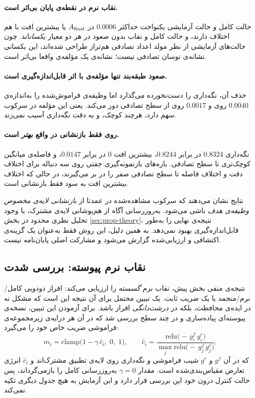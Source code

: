 

\paragraph{نقاب نرم در نقطه‌ی پایان بی‌اثر است.} حالت کامل و حالت آزمایشی یکنواخت حداکثر $0.0006$ در $A_{\mathrm{final}}$ یا بیشترین افت با هم اختلاف دارند، و حالت کامل و نقاب بدون صعود در هر دو معیار \emph{یکسان}اند. چون حالت‌های آزمایشی از نظر مولد اعداد تصادفی هم‌تراز طراحی شده‌اند، این یکسانی نشانه‌ی نوسان تصادفی نیست؛ نشانه‌ی یک مؤلفه‌ی واقعا بی‌اثر است.

\paragraph{صعود طبقه‌بند تنها مؤلفه‌ی با اثر قابل‌اندازه‌گیری است.} حذف آن، نگه‌داری را دست‌نخورده می‌گذارد اما وظیفه‌ی فراموش‌شده را به‌اندازه‌ی $0.0040$ روی  و $0.0017$ روی  از سطح تصادفی دور می‌کند. یعنی این مؤلفه در سرکوب سهم دارد، هرچند کوچک، و به دقت نگه‌داری آسیب نمی‌زند.

\paragraph{روی  فقط بازنشانی در واقع \emph{بهتر} است.} نگه‌داری $0.8324$ در برابر $0.8244$، بیشترین افت $0$ در برابر $0.0147$، و فاصله‌ی میانگین کوچک‌تری تا سطح تصادفی. بازه‌های بازنمونه‌گیری جفتی روی سه دنباله برای اختلاف دقت و اختلاف فاصله تا سطح تصادفی صفر را در بر می‌گیرند، در حالی که اختلاف بیشترین افت به سود فقط بازنشانی است.

نتایج نشان می‌دهند که سرکوب مشاهده‌شده در  عمدتا از \emph{بازنشانی لایه‌ی مخصوص وظیفه‌ی هدف} ناشی می‌شود. به‌روزرسانی آگاه از هم‌پوشانی لایه‌ی مشترک، با وجود تحلیل نظری محدود در بخش \ref{sec:prop-theory}، نتیجه‌ی نهایی را به‌طور قابل‌اندازه‌گیری بهبود نمی‌دهد. به همین دلیل، این روش فقط به‌عنوان یک گزینه‌ی اکتشافی و ارزیابی‌شده گزارش می‌شود و مشارکت اصلی پایان‌نامه نیست.

\subsection{نقاب نرم پیوسته: بررسی شدت}
\label{subsec:res-conflict-gamma}

نتیجه‌ی منفی بخش پیش، نقاب نرم \emph{گسسته} را ارزیابی می‌کند: افراز دودویی کامل/نرم/منجمد با یک ضریب ثابت. یک تبیین محتمل برای آن نتیجه این است که مشکل نه در ایده‌ی محافظت، بلکه در \emph{درشت‌دانگی} افراز باشد. برای آزمودن این تبیین، نسخه‌ی پیوسته‌ای پیاده‌سازی و در چند سطح بررسی شد که در آن هر درایه‌ی زیرمجموعه‌ی فراموشی ضریب خاص خود را می‌گیرد:
\begin{equation}
\label{eq:continuous-mask}
	m_i=\mathrm{clamp}\big(1-\gamma\,\hat c_i,\;0,\;1\big),
	\qquad
	\hat c_i=\frac{\mathrm{relu}\big(-\,g^{f}_i\,g^{r}_i\big)}{\max_j \mathrm{relu}\big(-\,g^{f}_j\,g^{r}_j\big)},
\end{equation}
که در آن $g^{f}$ و $g^{r}$ شیب فراموشی و نگه‌داری روی لایه‌ی تطبیق مشترک‌اند و $\hat c_i$ انرژی تعارض مقیاس‌بندی‌شده است. مقدار $\gamma=0$ به‌روزرسانی کامل را بازمی‌گرداند، پس حالت کنترل درون خود این بررسی قرار دارد و این آزمایش به هیچ جدول دیگری تکیه نمی‌کند.

